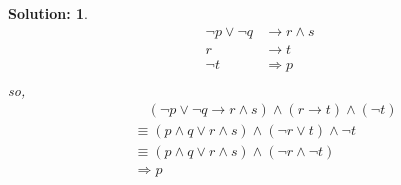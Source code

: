 \documentclass{article}
\theoremstyle{break}
\newtheorem*{solution*}{\textbf{Solution:} }
\begin{document}
\begin{enumerate}
\begin{solution*}
            \begin{equation}
                \begin{aligned}
                    \lnot p \lor \lnot q &\to r \land s \\
                    r &\to t \\
                    \lnot t &\Rightarrow p\\
                \end{aligned}
        \end{equation}
        so,
        \begin{equation*}
            \begin{aligned}
                & \quad (\lnot p \lor \lnot q \to r \land s) \land (r \to t) \land (\lnot t) \\
                & \equiv( p \land q \lor r \land s )\land (\lnot r \lor t) \land \lnot t \\
                & \equiv( p \land q \lor r \land s) \land ( \lnot r \land \lnot t) \\
                & \Rightarrow p
            \end{aligned}
        \end{equation*}
    \end{solution*}



\end{enumerate}
\end{document}
